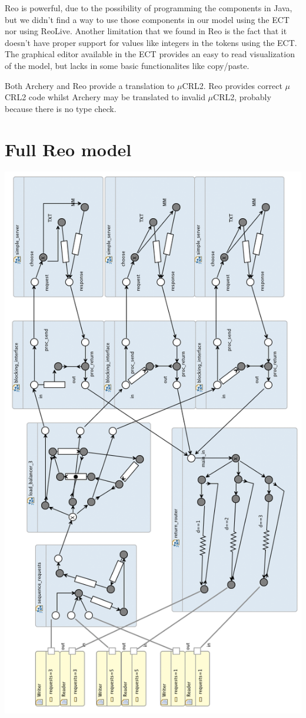 \documentclass[a4paper]{article}
\newcommand{\ar}{Archery\xspace}
\newcommand{\re}{Reo\xspace}
\newcommand{\mcrl}{$\mu$CRL2\xspace}
\begin{document}

\re is powerful, due to the possibility of programming the components in Java,
but we didn't find a way to use those components in our model using the ECT nor
using ReoLive. Another limitation that we found in \re is the fact that it
doesn't have proper support for values like integers in the tokens using the
ECT. The graphical editor available in the ECT provides an easy to read
visualization of the model, but lacks in some basic functionalites like
copy/paste.

Both \ar and \re provide a translation to \mcrl. \re provides correct \mcrl
code whilst \ar may be translated to invalid \mcrl, probably because there is
no type check.



\appendix
\section{Full \re model}\label{app:reo}


    \begin{center}
        \includegraphics[height=0.95\textheight]{images/reo-full.png}
    \end{center}
\end{document}
